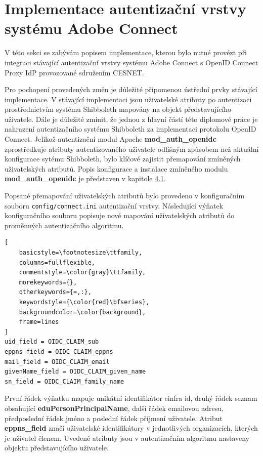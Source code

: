 \documentclass[
  printed, %
  twoside, %
  table,   %
  nolof,     %
  nolot,     %
]{fithesis3}
\begin{document}
\section{Implementace autentizační vrstvy systému Adobe Connect}
\label{ACImpl}
V této sekci se zabývám popisem implementace, kterou bylo nutné provézt při integraci stávající autentizační vrstvy systému Adobe Connect s OpenID Connect Proxy IdP provozované sdružením CESNET. 
\par 
Pro pochopení provedených změn je důležité připomenou ústřední prvky stávající implementace. V stávající implementaci jsou uživatelské atributy po autentizaci prostřednictvím systému Shibboleth mapovány na objekt představujícího uživatele. Dále je důležité zmínit, že jednou z hlavní částí této diplomové práce je nahrazení autentizačního systému Shibboleth za implementaci protokolu OpenID Connect. Jelikož autentizační modul Apache \textbf{mod\_auth\_openidc} zprostředkuje atributy autentizovaného uživatele odlišným způsobem než aktuální konfigurace sytému Shibboleth, bylo klíčové zajistit přemapování zmíněných uživatelských atributů. Popis konfigurace a instalace zmíněného modulu \textbf{mod\_auth\_openidc} je představen v kapitole \hyperref[apacheInstall]{4.1}.  
\par

Popsané přemapování uživatelských atributů bylo provedeno v konfiguračním souboru \texttt{config/connect.ini} autentizační vrstvy. Následující výňatek konfiguračního souboru popisuje nové mapování uživatelských atributů do proměnných autentizačního algoritmu. 

\begin{lstlisting}[
    basicstyle=\footnotesize\ttfamily,
    columns=fullflexible,
    commentstyle=\color{gray}\ttfamily,
    morekeywords={},
    otherkeywords={=,:},
    keywordstyle={\color{red}\bfseries},
    backgroundcolor=\color{background},
    frame=lines
]
uid_field = OIDC_CLAIM_sub
eppns_field = OIDC_CLAIM_eppns
mail_field = OIDC_CLAIM_email
givenName_field = OIDC_CLAIM_given_name
sn_field = OIDC_CLAIM_family_name
\end{lstlisting}
První řádek výňatku mapuje unikátní identifikátor einfra id, druhý řádek seznam obsahující \textbf{eduPersonPrincipalName}, další řádek emailovou adresu, předposlední řádek jméno a poslední řádek příjmení uživatele. Atribut \textbf{eppns\_field} značí uživatelské identifikátory v jednotlivých organizacích, kterých je uživatel členem. Uvedené atributy jsou v autentizačním algoritmu nastaveny objektu představujícího uživatele. 
\par 
\end{document}
